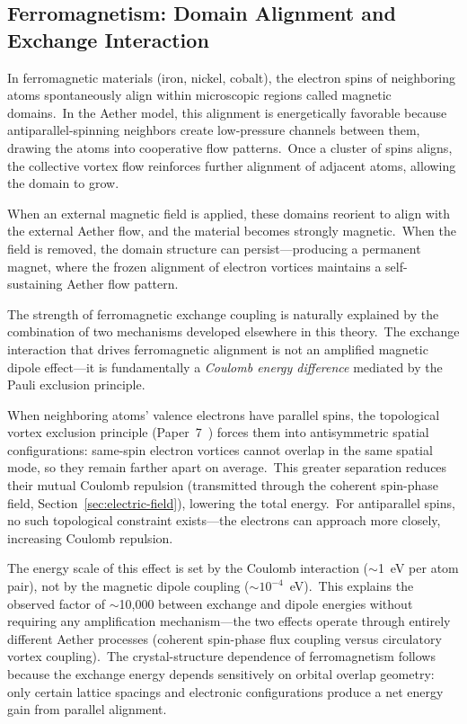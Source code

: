 ﻿\documentclass[12pt,letterpaper]{article}
\begin{document}
\subsection{Ferromagnetism: Domain Alignment and Exchange Interaction}

In ferromagnetic materials (iron, nickel, cobalt), the electron spins of neighboring atoms
spontaneously align within microscopic regions called magnetic domains.\ In the Aether
model, this alignment is energetically favorable because antiparallel-spinning neighbors
create low-pressure channels between them, drawing the atoms into cooperative flow
patterns.\ Once a cluster of spins aligns, the collective vortex flow reinforces further
alignment of adjacent atoms, allowing the domain to grow.

When an external magnetic field is applied, these domains reorient to align with the
external Aether flow, and the material becomes strongly magnetic.\ When the field is
removed, the domain structure can persist---producing a permanent magnet, where the frozen
alignment of electron vortices maintains a self-sustaining Aether flow pattern.

The strength of ferromagnetic exchange coupling is naturally explained by the
combination of two mechanisms developed elsewhere in this theory.\ The exchange
interaction that drives ferromagnetic alignment is not an amplified magnetic
dipole effect---it is fundamentally a \emph{Coulomb energy difference} mediated
by the Pauli exclusion principle.

When neighboring atoms' valence electrons have parallel spins, the topological
vortex exclusion principle (Paper~7~\cite{otto-quantum}) forces them into
antisymmetric spatial configurations: same-spin electron vortices cannot overlap
in the same spatial mode, so they remain farther apart on average.\ This greater
separation reduces their mutual Coulomb repulsion (transmitted through the coherent
spin-phase field, Section~\ref{sec:electric-field}), lowering the total
energy.\ For antiparallel spins, no such topological constraint exists---the
electrons can approach more closely, increasing Coulomb repulsion.

The energy scale of this effect is set by the Coulomb interaction ($\sim$1~eV per
atom pair), not by the magnetic dipole coupling ($\sim 10^{-4}$~eV).\ This
explains the observed factor of $\sim$10{,}000 between exchange and dipole
energies without requiring any amplification mechanism---the two effects operate
through entirely different Aether processes (coherent spin-phase flux coupling
versus circulatory vortex coupling).\ The crystal-structure dependence
of ferromagnetism
follows because the exchange energy depends sensitively on orbital overlap
geometry: only certain lattice spacings and electronic configurations produce a
net energy gain from parallel alignment.
\end{document}
